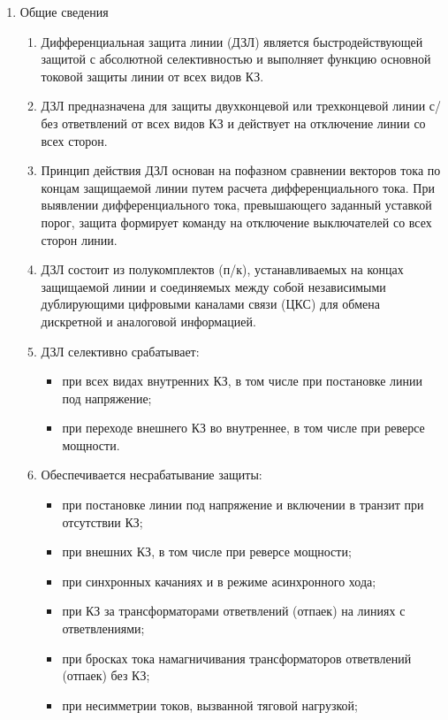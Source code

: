 \begin{enumerate}

\item Общие сведения
\begin{enumerate}
\item Дифференциальная защита линии (ДЗЛ) является быстродействующей защитой с абсолютной селективностью и выполняет функцию основной токовой защиты линии от всех видов КЗ.
\item ДЗЛ предназначена для защиты двухконцевой или трехконцевой линии с/без ответвлений от всех видов КЗ и действует на отключение линии со всех сторон.
\item Принцип действия ДЗЛ основан на пофазном сравнении векторов тока по концам защищаемой линии путем расчета дифференциального тока. При выявлении дифференциального тока, превышающего заданный уставкой порог, защита формирует команду на отключение выключателей со всех сторон линии.
\item ДЗЛ состоит из полукомплектов (п/к), устанавливаемых на концах защищаемой линии и соединяемых между собой независимыми дублирующими цифровыми каналами связи (ЦКС) для обмена дискретной и аналоговой информацией.
\item ДЗЛ селективно срабатывает:
  \begin{itemize}
    \item при всех видах внутренних КЗ, в том числе при постановке линии под напряжение;
    \item при переходе внешнего КЗ во внутреннее, в том числе при реверсе мощности.
  \end{itemize}
\item Обеспечивается несрабатывание защиты:
  \begin{itemize}
    \item при постановке линии под напряжение и включении в транзит при отсутствии КЗ;
    \item при внешних КЗ, в том числе при реверсе мощности;
    \item при синхронных качаниях и в режиме асинхронного хода;
    \item при КЗ за трансформаторами ответвлений (отпаек) на линиях с ответвлениями;
    \item при бросках тока намагничивания трансформаторов ответвлений (отпаек) без КЗ;
    \item при несимметрии токов, вызванной тяговой нагрузкой;

\end{itemize}
\end{enumerate}
\end{enumerate}
